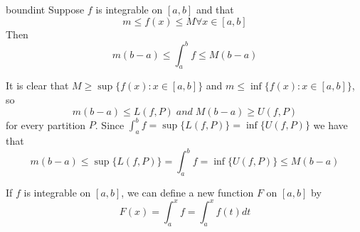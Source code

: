 \documentclass[12pt]{report}
\begin{document}
\begin{thm}{}{boundint}
    Suppose $f$ is integrable on $[a,b]$ and that \begin{equation}
        m \leq f(x) \leq M \forall x \in [a,b]
    \end{equation}
    Then \begin{equation}
        m(b-a) \leq \int_a^bf \leq M(b-a)
    \end{equation}
\end{thm}
\begin{proof*}{}{}
    It is clear that $M \geq \sup\{f(x):x \in [a,b]\}$ and $m \leq \inf\{f(x):x\in [a,b]\}$, so \begin{equation*}
        m(b-a) \leq L(f,P)\;and\;M(b-a) \geq U(f,P)
    \end{equation*}
    for every partition $P$. Since $\int_a^bf = \sup\{L(f,P)\} = \inf\{U(f,P)\}$ we have that \begin{equation*}
        m(b-a) \leq \sup\{L(f,P)\} = \int_a^bf = \inf\{U(f,P)\} \leq M(b-a)
    \end{equation*}
\end{proof*}

\begin{rmk}{}{}
    If $f$ is integrable on $[a,b]$, we can define a new function $F$ on $[a,b]$ by \begin{equation}
        F(x) = \int_a^xf = \int_a^xf(t)dt
    \end{equation}
\end{rmk}
\end{document}
